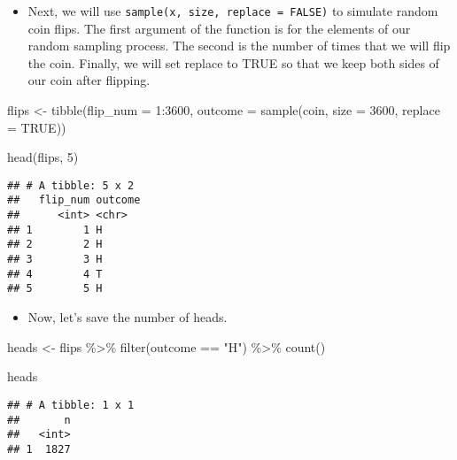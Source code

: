 \documentclass[
]{book}
\newenvironment{Shaded}{\begin{snugshade}}{\end{snugshade}}
\newcommand{\AttributeTok}[1]{\textcolor[rgb]{0.77,0.63,0.00}{#1}}
\newcommand{\ConstantTok}[1]{\textcolor[rgb]{0.00,0.00,0.00}{#1}}
\newcommand{\DecValTok}[1]{\textcolor[rgb]{0.00,0.00,0.81}{#1}}
\newcommand{\FunctionTok}[1]{\textcolor[rgb]{0.00,0.00,0.00}{#1}}
\newcommand{\NormalTok}[1]{#1}
\newcommand{\OtherTok}[1]{\textcolor[rgb]{0.56,0.35,0.01}{#1}}
\newcommand{\SpecialCharTok}[1]{\textcolor[rgb]{0.00,0.00,0.00}{#1}}
\newcommand{\StringTok}[1]{\textcolor[rgb]{0.31,0.60,0.02}{#1}}
\providecommand{\tightlist}{%
  \setlength{\itemsep}{0pt}\setlength{\parskip}{0pt}}
\begin{document}
\begin{itemize}
\tightlist
\item
  Next, we will use \texttt{sample(x,\ size,\ replace\ =\ FALSE)} to simulate random coin flips. The first argument of the function is for the elements of our random sampling process. The second is the number of times that we will flip the coin. Finally, we will set replace to TRUE so that we keep both sides of our coin after flipping.
\end{itemize}

\begin{Shaded}
\begin{Highlighting}[]
\NormalTok{flips }\OtherTok{\textless{}{-}} \FunctionTok{tibble}\NormalTok{(}\AttributeTok{flip\_num =} \DecValTok{1}\SpecialCharTok{:}\DecValTok{3600}\NormalTok{, }
                \AttributeTok{outcome =} \FunctionTok{sample}\NormalTok{(coin, }\AttributeTok{size =} \DecValTok{3600}\NormalTok{, }\AttributeTok{replace =} \ConstantTok{TRUE}\NormalTok{))}

\FunctionTok{head}\NormalTok{(flips, }\DecValTok{5}\NormalTok{)}
\end{Highlighting}
\end{Shaded}

\begin{verbatim}
## # A tibble: 5 x 2
##   flip_num outcome
##      <int> <chr>  
## 1        1 H      
## 2        2 H      
## 3        3 H      
## 4        4 T      
## 5        5 H
\end{verbatim}

\begin{itemize}
\tightlist
\item
  Now, let's save the number of heads.
\end{itemize}

\begin{Shaded}
\begin{Highlighting}[]
\NormalTok{heads }\OtherTok{\textless{}{-}}\NormalTok{ flips }\SpecialCharTok{\%\textgreater{}\%} 
  \FunctionTok{filter}\NormalTok{(outcome }\SpecialCharTok{==} \StringTok{"H"}\NormalTok{) }\SpecialCharTok{\%\textgreater{}\%} 
  \FunctionTok{count}\NormalTok{()}

\NormalTok{heads}
\end{Highlighting}
\end{Shaded}

\begin{verbatim}
## # A tibble: 1 x 1
##       n
##   <int>
## 1  1827
\end{verbatim}
\end{document}
